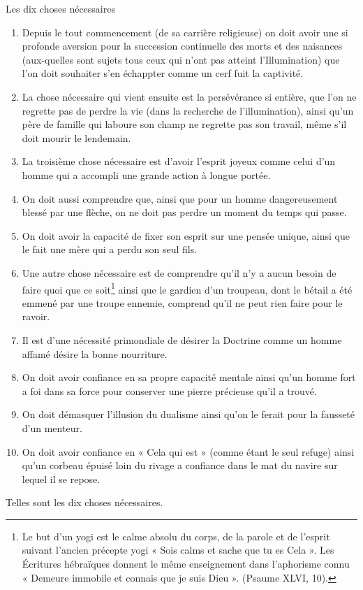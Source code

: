 \documentclass[10pt]{book}
\makeatletter
\renewcommand{\section}{\@startsection{section}{0}{0mm}
   {\baselineskip}
   {\baselineskip}{\normalfont\normalsize\scshape\centering}
}
\makeatother
\begin{document}
\section{Les dix choses nécessaires}
\begin{enumerate}[1.-]
\item Depuis le tout commencement (de sa carrière religieuse) on doit avoir une si profonde aversion pour la succession continuelle des morts et des naisances (aux-quelles sont sujets tous ceux qui n'ont pas atteint l'Illumination) que l'on doit souhaiter s'en échappter comme un cerf fuit la captivité.
\item La chose nécessaire qui vient ensuite est la persévérance si entière, que l'on ne regrette pas de perdre la vie (dans la recherche de l'illumination), ainsi qu'un père de famille qui laboure son champ ne regrette pas son travail, même s'il doit mourir le lendemain.
\item La troisième chose nécessaire est d'avoir l'esprit joyeux comme celui d'un homme qui a accompli une grande action à longue portée.
\item On doit aussi comprendre que, ainsi que pour un homme dangereusement blessé par une flèche, on ne doit pas perdre un moment du temps qui passe.
\item On doit avoir la capacité de fixer son esprit sur une pensée unique, ainsi que le fait une mère qui a perdu son seul fils.
\item Une autre chose nécessaire est de comprendre qu'il n'y a aucun besoin de faire quoi que ce soit\footnote{Le but d'un yogi est le calme absolu du corps, de la parole et de l'esprit suivant l'ancien précepte yogi « Sois calms et sache que tu es Cela ». Les Écritures hébraïques donnent le même enseignement dans l'aphorisme connu « Demeure immobile et connais que je suis Dieu ». (Psaume XLVI, 10).} ainsi que le gardien d'un troupeau, dont le bétail a été emmené par une troupe ennemie, comprend qu'il ne peut rien faire pour le ravoir.
\item Il est d'une nécessité primondiale de désirer la Doctrine comme un homme affamé désire la bonne nourriture.
\item On doit avoir confiance en sa propre capacité mentale ainsi qu'un homme fort a foi dans sa force pour conserver une pierre précieuse qu'il a trouvé.
\item On doit démasquer l'illusion du dualisme ainsi qu'on le ferait pour la fausseté d'un menteur.
\item On doit avoir confiance en « Cela qui est » (comme étant le seul refuge) ainsi qu'un corbeau épuisé loin du rivage a confiance dans le mat du navire sur lequel il se repose.
\end{enumerate}
Telles sont les dix choses nécessaires.
\end{document}
